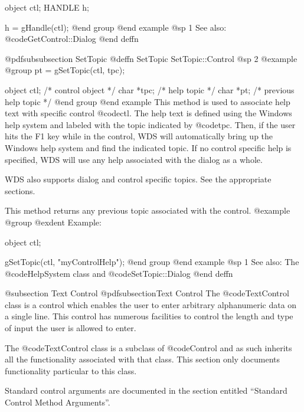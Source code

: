object  ctl;
HANDLE  h;

h = gHandle(ctl);
@end group
@end example
@sp 1
See also:  @code{GetControl::Dialog}
@end deffn











@pdfsubsubsection {SetTopic}
@deffn {SetTopic} SetTopic::Control
@sp 2
@example
@group
pt = gSetTopic(ctl, tpc);

object  ctl;    /*  control object        */
char    *tpc;   /*  help topic            */
char    *pt;    /*  previous help topic   */
@end group
@end example
This method is used to associate help text with specific control @code{ctl}.
The help text is defined using the Windows help system and labeled
with the topic indicated by @code{tpc}.  Then, if the user hits
the F1 key while in the control, WDS will automatically bring up
the Windows help system and find the indicated topic.  If no control
specific help is specified, WDS will use any help associated with the
dialog as a whole.

WDS also supports dialog and control specific topics.  See the appropriate
sections.

This method returns any previous topic associated with the control.
@example
@group
@exdent Example:

object  ctl;

gSetTopic(ctl, "myControlHelp");
@end group
@end example
@sp 1
See also:  The @code{HelpSystem} class and @code{SetTopic::Dialog}
@end deffn











@subsection Text Control
@pdfsubsection{Text Control}
The @code{TextControl} class is a control which enables the user to
enter arbitrary alphanumeric data on a single line.  This control
has numerous facilities to control the length and type of input the
user is allowed to enter.

The @code{TextControl} class is a subclass of @code{Control} and as such
inherits all the functionality associated with that class.  This section
only documents functionality particular to this class.

Standard control arguments are documented in the section entitled
``Standard Control Method Arguments''.












